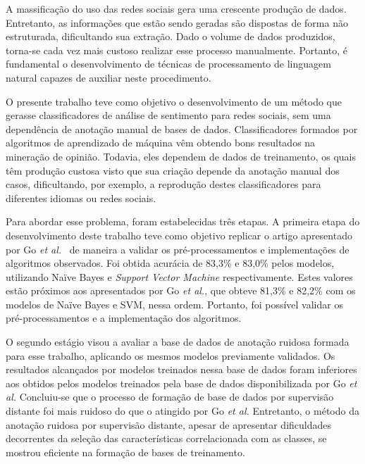 A massificação do uso das redes sociais gera uma crescente produção de dados.
Entretanto, as informações que estão sendo geradas são dispostas de forma não estruturada, dificultando sua extração.
Dado o volume de dados produzidos, torna-se cada vez mais custoso realizar esse processo manualmente.
Portanto, é fundamental o desenvolvimento de técnicas de processamento de linguagem natural capazes de auxiliar neste
procedimento.

O presente trabalho teve como objetivo o desenvolvimento de um método que gerasse classificadores de análise de sentimento
para redes sociais, sem uma dependência de anotação manual de bases de dados.
Classificadores formados por algoritmos de aprendizado de máquina vêm obtendo bons resultados na mineração de opinião.
Todavia, eles dependem de dados de treinamento, os quais têm produção custosa visto que sua criação depende da anotação
manual dos casos, dificultando, por exemplo, a reprodução destes classificadores para diferentes idiomas ou redes
sociais.

Para abordar esse problema, foram estabelecidas três etapas.
A primeira etapa do desenvolvimento deste trabalho teve como objetivo replicar o artigo apresentado por Go
\textit{et al.}~\cite{go09} de maneira a validar os pré-processamentos e implementações de algoritmos observados.
Foi obtida acurácia de 83,3\% e 83,0\% pelos modelos, utilizando Naïve Bayes e \textit{Support Vector Machine} respectivamente.
Estes valores estão próximos aos apresentados por Go \textit{et al.}, que obteve 81,3\% e 82,2\% com os modelos de Naïve
Bayes e SVM, nessa ordem.
Portanto, foi possível validar os pré-processamentos e a implementação dos algoritmos.

O segundo estágio visou a avaliar a base de dados de anotação ruidosa formada para esse trabalho,
aplicando os mesmos modelos previamente validados.
Os resultados alcançados por modelos treinados nessa base de dados foram inferiores aos obtidos pelos modelos treinados
pela base de dados disponibilizada por Go \textit{et al.}
Concluiu-se que o processo de formação de base de dados por supervisão distante foi mais ruidoso do que o atingido por
Go \textit{et al.}
Entretanto, o método da anotação ruidosa por supervisão distante, apesar de apresentar dificuldades decorrentes da
seleção das características correlacionada com as classes, se mostrou eficiente na formação de bases de treinamento.

